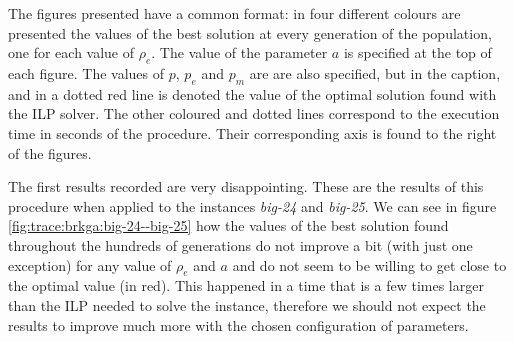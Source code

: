 \hfill

The figures presented have a common format: in four different colours are presented the
values of the best solution at every generation of the population, one for each value of
$\rho_e$. The value of the parameter $a$ is specified at the top of each figure. The values
of $p$, $p_e$ and $p_m$ are are also specified, but in the caption, and in a dotted red line
is denoted the value of the optimal solution found with the ILP solver. The other coloured
and dotted lines correspond to the execution time in seconds of the procedure. Their
corresponding axis is found to the right of the figures.

\hfill

The first results recorded are very disappointing. These are the results of this procedure
when applied to the instances \textit{big-24} and \textit{big-25}. We can see in figure
\ref{fig:trace:brkga:big-24--big-25} how the values of the best solution found throughout the
hundreds of generations do not improve a bit (with just one exception) for any value of
$\rho_e$ and $a$ and do not seem to be willing to get close to the optimal value (in red).
This happened in a time that is a few times larger than the ILP needed to solve the instance,
therefore we should not expect the results to improve much more with the chosen configuration
of parameters.

